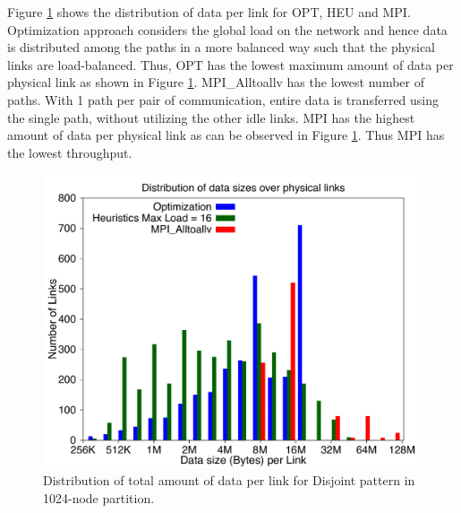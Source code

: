 Figure \ref{fig:loaddata_histo} shows the distribution of data per link for OPT, HEU and MPI. Optimization approach considers the global load on the network and hence data is distributed among the paths in a more balanced way such that the physical links are load-balanced. Thus, OPT has the lowest maximum amount of data per physical link as shown in Figure \ref{fig:loaddata_histo}. MPI\_Alltoallv has the lowest number of paths. With 1 path per pair of communication, entire data is transferred using the single path, without utilizing the other idle links. %
MPI has the highest amount of data per physical link as can be observed in Figure \ref{fig:loaddata_histo}. Thus MPI has the lowest throughput.
\begin{figure}[!htb]
\vspace{-0.15in}
\centering
\includegraphics[scale=0.27]{figures/loaddata_histo.pdf}
\vspace{-0.15in}
\caption{Distribution of total amount of data per link for Disjoint pattern in 1024-node partition.}
\vspace{-0.15in}
\label{fig:loaddata_histo}
\end{figure}




